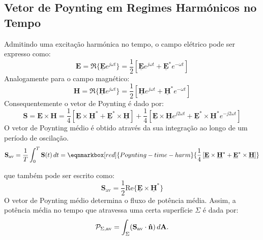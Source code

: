\subsection{Vetor de Poynting em Regimes Harmónicos no Tempo}
Admitindo uma excitação harmónica no tempo, o campo elétrico pode ser expresso como:
\begin{equation}
    \mathbf{E} = \Re\{\mathbf{\underline{E}}e^{j\omega t}\} = \frac{1}{2}\left[\mathbf{\underline{E}}e^{j\omega t} + \mathbf{\underline{E}^*}e^{-\omega t}\right]
\end{equation}
Analogamente para o campo magnético:
\begin{equation}
    \mathbf{H} = \Re\{\mathbf{\underline{H}}e^{j\omega t}\} = \frac{1}{2}\left[\mathbf{\underline{H}}e^{j\omega t} + \mathbf{\underline{H}^*}e^{-\omega t}\right]
\end{equation}
Consequentemente o vetor de Poynting é dado por:
\begin{equation}
    \mathbf{S} = \mathbf{E} \times \mathbf{H} =
    \frac{1}{4}\left[\mathbf{\underline{E}}\times\mathbf{\underline{H}}^* + \mathbf{\underline{E}}^*\times\mathbf{\underline{H}}\right] + \frac{1}{4}\left[\mathbf{\underline{E}}\times\mathbf{\underline{H}}e^{j2\omega t} + \mathbf{\underline{E}}^*\times\mathbf{\underline{H}}^*e^{-j2\omega t}\right]
\end{equation}
O vetor de Poynting médio  é obtido através da sua integração ao longo de um período de oscilação.
\begin{equation}
    \mathbf{S}_\text{av} = \frac{1}{T}\int_0^T \mathbf{S}(t) \, dt  = \eqnmarkbox[red]{Poynting-time-harm}{\frac{1}{4} \left[\mathbf{\underline{E}}\times\mathbf{\underline{H}}^* + \mathbf{\underline{E}}^*\times\mathbf{\underline{H}}\right]}
\end{equation}

 que também pode ser escrito como:
 \begin{equation}
    \mathbf{S}_\text{av} = \frac{1}{2} \text{Re} \{ \mathbf{\underline{E}} \times \mathbf{\underline{H}}^* \}
\end{equation}
O vetor de Poynting médio determina o fluxo de potência média. Assim, a potência média no tempo que atravessa uma certa superfície $\Sigma$ é dada por:
\begin{equation}
    \mathcal{P}_{\Sigma, \text{av}} = \int_{\Sigma} (\mathbf{S}_{\text{av}}\cdot\mathbf{\Hat{n}}) \, d\mathbf{A}.
\end{equation}

